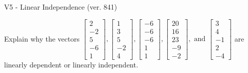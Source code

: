 \begin{exercise}
  \begin{exerciseTitle}V5 - Linear Independence (ver. 841)\end{exerciseTitle}
  \begin{exerciseStatement}
    Explain why the vectors \(\left[\begin{array}{r}
2 \\
-2 \\
5 \\
-6 \\
1
\end{array}\right] , \left[\begin{array}{r}
1 \\
3 \\
5 \\
-2 \\
4
\end{array}\right] , \left[\begin{array}{r}
-6 \\
-6 \\
-6 \\
1 \\
1
\end{array}\right] , \left[\begin{array}{r}
20 \\
16 \\
23 \\
-9 \\
-2
\end{array}\right] , \text{ and } \left[\begin{array}{r}
3 \\
4 \\
-1 \\
2 \\
-4
\end{array}\right]\) are linearly dependent or linearly independent.	



\end{exerciseStatement}
\end{exercise}
